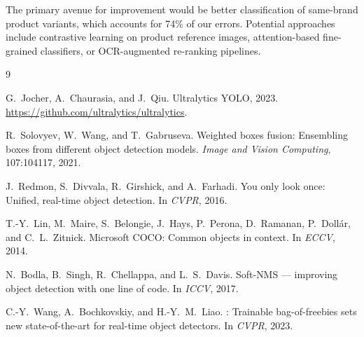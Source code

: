 \documentclass[11pt,a4paper]{article}
\begin{document}
The primary avenue for improvement would be better classification of same-brand product variants, which accounts for 74\% of our errors.
Potential approaches include contrastive learning on product reference images, attention-based fine-grained classifiers, or OCR-augmented re-ranking pipelines.


\begin{thebibliography}{9}

G.~Jocher, A.~Chaurasia, and J.~Qiu.
\newblock Ultralytics {YOLO}, 2023.
\newblock \url{https://github.com/ultralytics/ultralytics}.

R.~Solovyev, W.~Wang, and T.~Gabruseva.
\newblock Weighted boxes fusion: Ensembling boxes from different object detection models.
\newblock \emph{Image and Vision Computing}, 107:104117, 2021.

J.~Redmon, S.~Divvala, R.~Girshick, and A.~Farhadi.
\newblock You only look once: Unified, real-time object detection.
\newblock In \emph{CVPR}, 2016.

T.-Y.~Lin, M.~Maire, S.~Belongie, J.~Hays, P.~Perona, D.~Ramanan, P.~Doll{\'a}r, and C.~L.~Zitnick.
\newblock Microsoft {COCO}: Common objects in context.
\newblock In \emph{ECCV}, 2014.

N.~Bodla, B.~Singh, R.~Chellappa, and L.~S.~Davis.
\newblock Soft-{NMS} --- improving object detection with one line of code.
\newblock In \emph{ICCV}, 2017.

C.-Y.~Wang, A.~Bochkovskiy, and H.-Y.~M.~Liao.
: Trainable bag-of-freebies sets new state-of-the-art for real-time object detectors.
\newblock In \emph{CVPR}, 2023.

\end{thebibliography}
\end{document}
